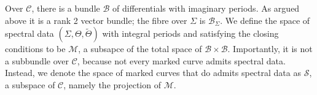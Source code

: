 Over $\mathcal{C}$, there is a bundle $\mathcal{B}$ of differentials with imaginary periods. As argued above it is a rank 2 vector bundle; the fibre over $Σ$ is $\mathcal{B}_Σ$. We define the space of spectral data $(Σ,Θ,\tilde{Θ})$ with integral periods and satisfying the closing conditions to be $\mathcal{M}$, a subsapce of the total space of $\mathcal{B}\times\mathcal{B}$. Importantly, it is not a subbundle over $\mathcal{C}$, because not every marked curve admits spectral data. Instead, we denote the space of marked curves that do admits spectral data as $\mathcal{S}$, a subspace of $\mathcal{C}$, namely the projection of $\mathcal{M}$.
